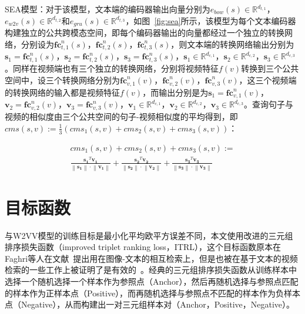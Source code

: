 SEA模型：对于该模型，文本端的编码器输出向量分别为$e_{bow}(s) \in \mathbb{R}^{d_{t,1}}$，$e_{w2v}(s) \in \mathbb{R}^{d_{t,2}}$和$e_{gru}(s) \in \mathbb{R}^{d_{t,3}}$，如图~\ref{fig:sea}所示，该模型为每个文本编码器构建独立的公共跨模态空间，即每个编码器输出的向量都经过一个独立的转换网络，分别设为$\bm{\mathbf{fc}}_{t,1}^n(s)$，$\bm{\mathbf{fc}}_{t,2}^n(s)$，$\bm{\mathbf{fc}}_{t,3}^n(s)$，则文本端的转换网络输出分别为$\mathbf{s}_1 = \bm{\mathbf{fc}}_{t,1}^n(s)$，$\mathbf{s}_2 = \bm{\mathbf{fc}}_{t,2}^n(s)$，$\mathbf{s}_3 = \bm{\mathbf{fc}}_{t,3}^n(s)$，$\mathbf{s}_1 \in \mathbb{R}^{d_{c,1}}$，$\mathbf{s}_2 \in \mathbb{R}^{d_{c,2}}$，$\mathbf{s}_3 \in \mathbb{R}^{d_{c,3}}$。同样在视频端也有三个独立的转换网络，分别将视频特征$f(v)$转换到三个公共空间中，设三个转换网络分别为$\bm{\mathbf{fc}}_{v,1}^n(v)$，$\bm{\mathbf{fc}}_{v,2}^n(v)$，$\bm{\mathbf{fc}}_{v,3}^n(v)$，这三个视频端的转换网络的输入都是视频特征$f(v)$，而输出分别是为$\mathbf{s}_1 = \bm{\mathbf{fc}}_{v,1}^n(v)$，$\mathbf{v}_2 = \bm{\mathbf{fc}}_{v,2}^n(v)$，$\mathbf{v}_3 = \bm{\mathbf{fc}}_{v,3}^n(v)$，$\mathbf{v}_1 \in \mathbb{R}^{d_{c,1}}$，$\mathbf{v}_2 \in \mathbb{R}^{d_{c,2}}$，$\mathbf{v}_3 \in \mathbb{R}^{d_{c,3}}$。查询句子与视频的相似度由三个公共空间的句子-视频相似度的平均得到，即$cms(s,v) := \frac{1}{3}(cms_1(s,v)+cms_2(s,v)+cms_3(s,v))$：

\begin{equation}
    \label{eq:cosine-sim-3}
    \begin{aligned}
        cms_1(s,v)+cms_2(s,v)+cms_3(s,v) := \\
        \frac{\mathbf{s_1}^T\mathbf{v_1}}{\left\| \mathbf{s_1} \right\| \cdot \left\| \mathbf{v_1} \right\|}+\frac{\mathbf{s_2}^T\mathbf{v_2}}{\left\| \mathbf{s_2} \right\| \cdot \left\| \mathbf{v_2} \right\|}+\frac{\mathbf{s_3}^T\mathbf{v_3}}{\left\| \mathbf{s_3} \right\| \cdot \left\| \mathbf{v_3} \right\|}
    \end{aligned}
\end{equation}

\section{目标函数}
与W2VV模型的训练目标是最小化平均欧平方误差不同，本文使用改进的三元组排序损失函数（improved triplet ranking loss，ITRL），这个目标函数原本在Faghri等人在文献~\cite{faghri2017vse++}提出用在图像-文本的相互检索上，但是也被在基于文本的视频检索的一些工作上被证明了是有效的~\cite{mithun2018learning,dong2019dual,liu2019use,wu2019hybrid,li2019w2vv++}。经典的三元组排序损失函数从训练样本中选择一个随机选择一个样本作为参照点（Anchor），然后再随机选择与参照点匹配的样本作为正样本点（Positive），而再随机选择与参照点不匹配的样本作为负样本点（Negative），从而构建出一对三元组样本对（Anchor，Positive，Negative）。

